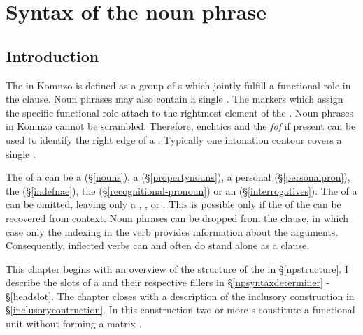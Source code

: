 
\chapter{Syntax of the noun phrase}\label{cha:npsyntax}

\section{Introduction}\label{npsyntax}

The  in Komnzo is defined as a group of s which jointly fulfill a functional role in the clause. Noun phrases may also contain a single . The  markers which assign the specific functional role attach to the rightmost element of the . Noun phrases in Komnzo cannot be scrambled. Therefore,  enclitics and the   \emph{fof} \textendash{} if present \textendash{} can be used to identify the right edge of a . Typically one intonation contour covers a single .%

The  of a  can be a  (\S{}\ref{nouns}), a  (\S{}\ref{propertynouns}), a personal  (\S{}\ref{personalpron}), the   (\S{}\ref{indefnae}), the   (\S{}\ref{recognitional-pronoun}) or an  (\S{}\ref{interrogatives}). The  of a  can be omitted, leaving only a , ,  or . This is possible only if the  of the  can be recovered from context. Noun phrases can be dropped from the clause, in which case only the indexing in the verb provides information about the arguments. Consequently, inflected verbs can and often do stand alone as a clause.%

This chapter begins with an overview of the structure of the  in \S{}\ref{npstructure}. I describe the slots of a  and their respective fillers in \S{}\ref{npsyntaxdeterminer} - \S{}\ref{headslot}. The chapter closes with a description of the inclusory construction in \S{}\ref{inclusorycontruction}. In this construction two or more s constitute a functional unit without forming a matrix .

